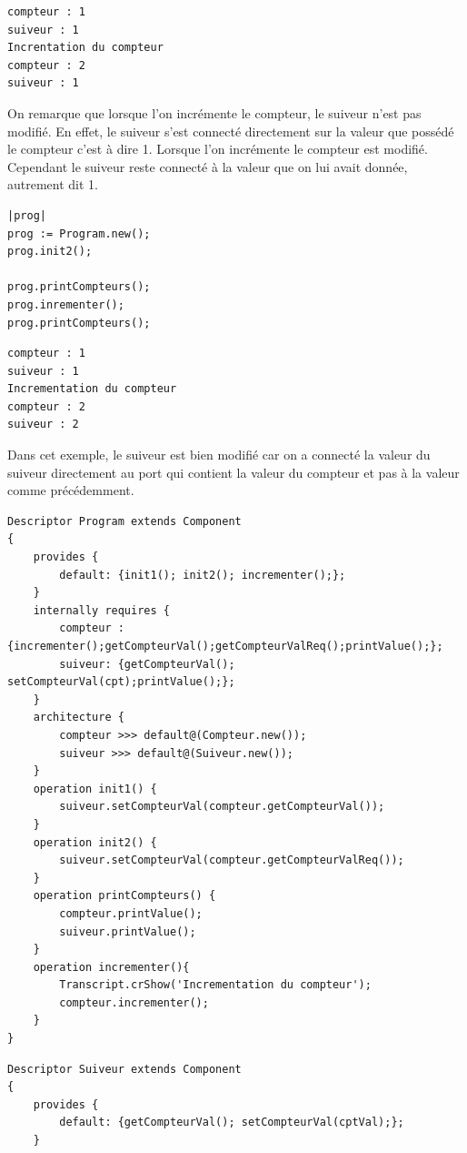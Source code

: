 \documentclass[11pt,a4paper,openany,oneside]{book}
\begin{document}
\begin{appendices}
\begin{lstlisting}[language=Compo, frame=single, caption=Output (Retour classique)]
compteur : 1
suiveur : 1
Increntation du compteur
compteur : 2
suiveur : 1
\end{lstlisting}

On remarque que lorsque l'on incrémente le compteur, le suiveur n'est pas modifié. En effet, le suiveur s'est connecté directement sur la valeur que possédé le compteur c'est à dire 1. Lorsque l'on incrémente le compteur est modifié. Cependant le suiveur reste connecté à la valeur que on lui avait donnée, autrement dit 1.

\begin{lstlisting}[language=Compo, frame=single, caption=Output (Retour par requis)]
|prog|
prog := Program.new();
prog.init2();

prog.printCompteurs();
prog.inrementer();
prog.printCompteurs();
\end{lstlisting}

\begin{lstlisting}[language=Compo, frame=single, caption=Output (Retour par requis)]
compteur : 1
suiveur : 1
Incrementation du compteur
compteur : 2
suiveur : 2
\end{lstlisting}

Dans cet exemple, le suiveur est bien modifié car on a connecté la valeur du suiveur directement au port qui contient la valeur du compteur et pas à la valeur comme précédemment.


\clearpage

\begin{lstlisting}[language=Compo, frame=single, caption=Le programme]
Descriptor Program extends Component
{
	provides {
		default: {init1(); init2(); incrementer();};
	}
	internally requires {
		compteur : {incrementer();getCompteurVal();getCompteurValReq();printValue();};
		suiveur: {getCompteurVal(); setCompteurVal(cpt);printValue();};
	}
	architecture {
	    compteur >>> default@(Compteur.new());
	    suiveur >>> default@(Suiveur.new());
	}
	operation init1() {
    	suiveur.setCompteurVal(compteur.getCompteurVal());
	}
	operation init2() {
        suiveur.setCompteurVal(compteur.getCompteurValReq());
	}
	operation printCompteurs() {
        compteur.printValue();
        suiveur.printValue();
	}
	operation incrementer(){
        Transcript.crShow('Incrementation du compteur');
        compteur.incrementer();
	}
}
\end{lstlisting}

\begin{lstlisting}[language=Compo, frame=single, caption=Programme Suiveur]
Descriptor Suiveur extends Component
{
	provides {
		default: {getCompteurVal(); setCompteurVal(cptVal);};
	}
	

\end{lstlisting}
\end{appendices}
\end{document}
